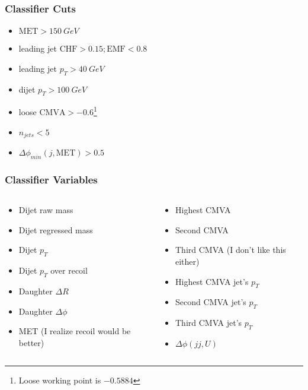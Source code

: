 \documentclass{beamer}
\begin{document}
\begin{frame}
  \frametitle{Classifier Cuts}
  \begin{itemize}
  \item $\mathrm{MET} > \SI{150}{GeV}$
  \item leading jet $\mathrm{CHF} > 0.15; \mathrm{EMF} < 0.8$
  \item leading jet $p_T > \SI{40}{GeV}$
  \item dijet $p_T > \SI{100}{GeV}$
  \item loose  $\mathrm{CMVA} > -0.6$\footnote{Loose working point is $-0.5884$}
  \item $n_{jets} < 5$
  \item $\Delta\phi_{min}(j, \mathrm{MET}) > 0.5$
  \end{itemize}
\end{frame}

\begin{frame}
  \frametitle{Classifier Variables}
  \begin{columns}
    \begin{column}{0.5\linewidth}
      \begin{itemize}
      \item Dijet raw mass
      \item Dijet regressed mass
      \item Dijet $p_T$
      \item Dijet $p_T$ over recoil
      \item Daughter $\Delta R$
      \item Daughter $\Delta \phi$
      \item MET (I realize recoil would be better)
      \end{itemize}
    \end{column}
    \begin{column}{0.5\linewidth}
      \begin{itemize}
      \item Highest CMVA
      \item Second CMVA
      \item Third CMVA (I don't like this either)
      \item Highest CMVA jet's $p_T$
      \item Second CMVA jet's $p_T$
      \item Third CMVA jet's $p_T$
      \item $\Delta \phi (jj, U)$
      \end{itemize}
    \end{column}
  \end{columns}
\end{frame}
\end{document}
